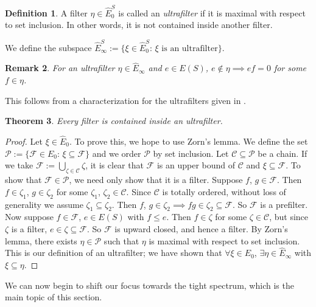 \documentclass[12pt]{article}
\newtheorem{theorem}{Theorem}[section]
\newtheorem{remark}[theorem]{Remark}
\theoremstyle{definition}
\newtheorem{definition}[theorem]{Definition}
\begin{document}
\begin{definition}
    A filter $\eta \in \hat{E}_0^S$ is called an \emph{ultrafilter} if it is 
    maximal with respect to set inclusion. In other words, it is not contained
    inside another filter.
\end{definition}
We define the subspace $\hat{E}_\infty^S := \{\xi \in \hat{E}_0^S\text{: $\xi$ is an ultrafilter}\}$.

\begin{remark} For an ultrafilter $\eta \in \hat{E}_\infty$ and $e \in E(S)$, $e \notin \eta \implies ef = 0$ for some $f \in \eta$. \end{remark}
This follows from a characterization for the ultrafilters given in \parencite[Lemma 12.3]{exel}.

\begin{theorem} Every filter is contained inside an ultrafilter. \end{theorem}
\begin{proof}
    Let $\xi \in \hat{E}_0$. To prove this, we hope to use Zorn's lemma. We define the set 
    $\mathcal{P} := \{\mathcal{F} \in \hat{E_0} \text{: } \xi \subseteq \mathcal{F}\}$ and 
    we order $\mathcal{P}$ by set inclusion. Let $\mathcal{C} \subseteq \mathcal{P}$ be a chain. 
    If we take $\mathcal{F} := \bigcup_{\zeta \in \mathcal{C}} \zeta$, it is clear that $\mathcal{F}$ is 
    an upper bound of $\mathcal{C}$ and $\xi \subseteq \mathcal{F}$. To show that $\mathcal{F} \in \mathcal{P}$, we
    need only show that it is a filter. Suppose $f$, $g \in \mathcal{F}$. Then $f \in \zeta_1$, $g \in \zeta_2$ for
    some $\zeta_1$, $\zeta_2 \in \mathcal{C}$. Since $\mathcal{C}$ is totally ordered, without loss of generality we
    assume $\zeta_1 \subseteq \zeta_2$. Then $f$, $g \in \zeta_2 \implies fg \in \zeta_2 \subseteq \mathcal{F}$.
    So $\mathcal{F}$ is a prefilter. Now suppose $f \in \mathcal{F}$, $e \in E(S)$ with $f \leq e$. Then $f \in \zeta$ for
    some $\zeta \in \mathcal{C}$, but since $\zeta$ is a filter, $e \in \zeta \subseteq \mathcal{F}$. So $\mathcal{F}$ is
    upward closed, and hence a filter. By Zorn's lemma, there exists $\eta \in \mathcal{P}$ such that $\eta$ is maximal
    with respect to set inclusion. This is our definition of an ultrafilter; we have shown that $\forall \xi \in \hat{E}_0$, $\exists \eta \in \hat{E}_\infty$ with
    $\xi \subseteq \eta$.
\end{proof}

We can now begin to shift our focus towards the tight spectrum, which is the main topic of this section.
\end{document}
